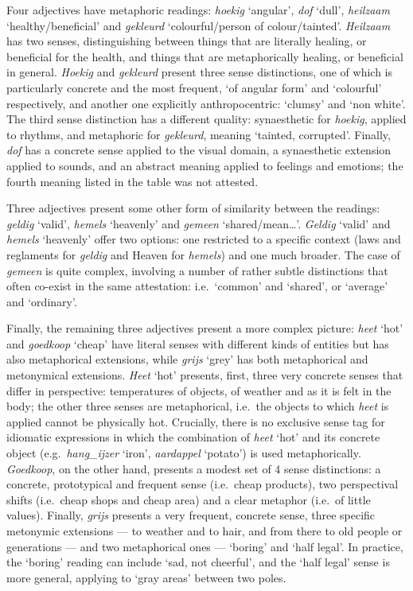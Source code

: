 \documentclass[
]{book}
\begin{document}
Four adjectives have metaphoric readings: \emph{hoekig} `angular', \emph{dof} `dull', \emph{heilzaam} `healthy/beneficial' and \emph{gekleurd} `colourful/person of colour/tainted'.
\emph{Heilzaam} has two senses, distinguishing between things that are literally healing, or beneficial for the health, and things that are metaphorically healing, or beneficial in general.
\emph{Hoekig} and \emph{gekleurd} present three sense distinctions, one of which is particularly concrete and the most frequent, `of angular form' and `colourful' respectively, and another one explicitly anthropocentric: `clumsy' and `non white'. The third sense distinction has a different quality: synaesthetic for \emph{hoekig}, applied to rhythms, and metaphoric for \emph{gekleurd}, meaning `tainted, corrupted'.
Finally, \emph{dof} has a concrete sense applied to the visual domain, a synaesthetic extension applied to sounds, and an abstract meaning applied to feelings and emotions; the fourth meaning listed in the table was not attested.

Three adjectives present some other form of similarity between the readings: \emph{geldig} `valid', \emph{hemels} `heavenly' and \emph{gemeen} `shared/mean\ldots{}'.
\emph{Geldig} `valid' and \emph{hemels} `heavenly' offer two options: one restricted to a specific context (laws and reglaments for \emph{geldig} and Heaven for \emph{hemels}) and one much broader.
The case of \emph{gemeen} is quite complex, involving a number of rather subtle distinctions that often co-exist in the same attestation: i.e.~`common' and `shared', or `average' and `ordinary'.

Finally, the remaining three adjectives present a more complex picture: \emph{heet} `hot' and \emph{goedkoop} `cheap' have literal senses with different kinds of entities but has also metaphorical extensions, while \emph{grijs} `grey' has both metaphorical and metonymical extensions.
\emph{Heet} `hot' presents, first, three very concrete senses that differ in perspective: temperatures of objects, of weather and as it is felt in the body; the other three senses are metaphorical, i.e.~the objects to which \emph{heet} is applied cannot be physically hot. Crucially, there is no exclusive sense tag for idiomatic expressions in which the combination of \emph{heet} `hot' and its concrete object (e.g.~\emph{hang\_ijzer} `iron', \emph{aardappel} `potato') is used metaphorically. \emph{Goedkoop}, on the other hand, presents a modest set of 4 sense distinctions: a concrete, prototypical and frequent sense (i.e.~cheap products), two perspectival shifts (i.e.~cheap shops and cheap area) and a clear metaphor (i.e.~of little values).
Finally, \emph{grijs} presents a very frequent, concrete sense, three specific metonymic extensions --- to weather and to hair, and from there to old people or generations --- and two metaphorical ones --- `boring' and `half legal'. In practice, the `boring' reading can include `sad, not cheerful', and the `half legal' sense is more general, applying to `gray areas' between two poles.
\end{document}
